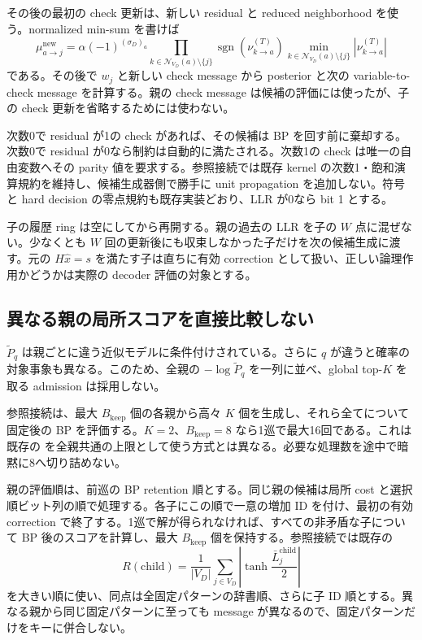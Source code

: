 \documentclass[a4paper,11pt]{ltjsarticle}
\numberwithin{equation}{section}
\theoremstyle{definition}
\newcommand{\N}{\mathcal N}
\newcommand{\code}[1]{\texttt{\detokenize{#1}}}
\begin{document}
その後の最初の check 更新は、新しい residual と reduced neighborhood を使う。normalized min-sum を書けば
\begin{equation}
 \mu_{a\to j}^{\mathrm{new}}=
 \alpha(-1)^{(\sigma_D)_a}
 \prod_{k\in\N_{V_D}(a)\setminus\{j\}}
       \operatorname{sgn}(\nu_{k\to a}^{(T)})
 \min_{k\in\N_{V_D}(a)\setminus\{j\}}
       |\nu_{k\to a}^{(T)}|
 \label{eq:warm-update}
\end{equation}
である。その後で $w_j$ と新しい check message から posterior と次の variable-to-check message を計算する。親の check message は候補の評価には使ったが、子の check 更新を省略するためには使わない。

次数0で residual が1の check があれば、その候補は BP を回す前に棄却する。次数0で residual が0なら制約は自動的に満たされる。次数1の check は唯一の自由変数へその parity 値を要求する。参照接続では既存 kernel の次数1・飽和演算規約を維持し、候補生成器側で勝手に unit propagation を追加しない。符号と hard decision の零点規約も既存実装どおり、LLR が0なら bit 1 とする\cite{repo}。

子の履歴 ring は空にしてから再開する。親の過去の LLR を子の $W$ 点に混ぜない。少なくとも $W$ 回の更新後にも収束しなかった子だけを次の候補生成に渡す。元の $H\hat x=s$ を満たす子は直ちに有効 correction として扱い、正しい論理作用かどうかは実際の decoder 評価の対象とする。

\subsection{異なる親の局所スコアを直接比較しない}
$\widetilde P_q$ は親ごとに違う近似モデルに条件付けされている。さらに $q$ が違うと確率の対象事象も異なる。このため、全親の $-\log\widetilde P_q$ を一列に並べ、global top-$K$ を取る admission は採用しない。

参照接続は、最大 $B_{\mathrm{keep}}$ 個の各親から高々 $K$ 個を生成し、それら全てについて固定後の BP を評価する。$K=2$、$B_{\mathrm{keep}}=8$ なら1巡で最大16回である。これは既存の \code{k_run} を全親共通の上限として使う方式とは異なる。必要な処理数を途中で暗黙に8へ切り詰めない。

親の評価順は、前巡の BP retention 順とする。同じ親の候補は局所 cost と選択順ビット列の順で処理する。各子にこの順で一意の増加 ID を付け、最初の有効 correction で終了する。1巡で解が得られなければ、すべての非矛盾な子について BP 後のスコアを計算し、最大 $B_{\mathrm{keep}}$ 個を保持する。参照接続では既存の
\begin{equation}
 R(\text{child})=
 \frac1{|V_D|}\sum_{j\in V_D}
       \left|\tanh\frac{\bar L_j^{\mathrm{child}}}{2}\right|
 \label{eq:retention}
\end{equation}
を大きい順に使い、同点は全固定パターンの辞書順、さらに子 ID 順とする。異なる親から同じ固定パターンに至っても message が異なるので、固定パターンだけをキーに併合しない。
\end{document}
